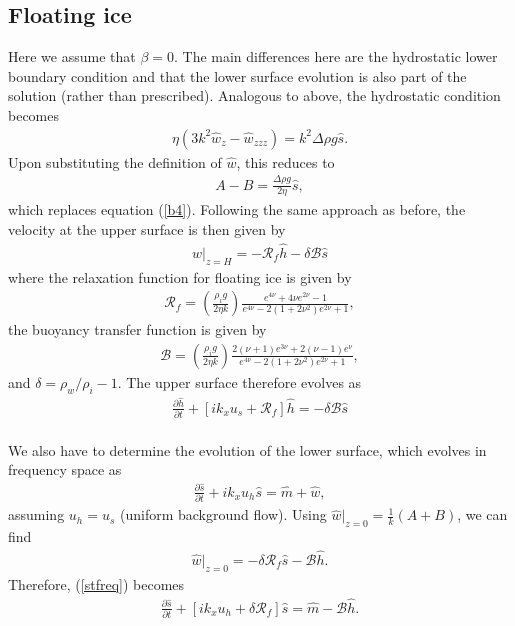 \documentclass[paper=a4, fontsize=11pt]{article}
\begin{document}
\subsection*{Floating ice}
Here we assume that $\beta=0$.
The main differences here are the hydrostatic lower boundary condition
and that the lower surface evolution is also part of the solution (rather than prescribed).
Analogous to above, the hydrostatic condition becomes
\begin{align}
\eta (3k^2 \widehat{w}_{z}-\widehat{w}_{zzz})  = k^2 \Delta\rho g \widehat{s}. \label{b4alt}
\end{align}
Upon substituting the definition of $\widehat{w}$, this reduces to
\begin{align}
A-B = \frac{\Delta \rho g}{2\eta}\widehat{s},
\end{align}
which replaces equation (\ref{b4}).
Following the same approach as before, the velocity at the upper surface is then given by
\begin{align}
w|_{z=H} =  -\mathcal{R}_f\widehat{h} - \delta\mathcal{B}\widehat{s}
\end{align}
where the relaxation function for floating ice is given by
\begin{align}
\mathcal{R}_f = \left(\frac{\rho_i g}{2\eta k}\right) \frac{e^{4\nu} +4\nu e^{2\nu} -1 }{e^{4\nu} -2(1+2\nu^2)e^{2\nu} +1},
\end{align}
the buoyancy transfer function is given by
\begin{align}
\mathcal{B} = \left(\frac{\rho_i g}{2\eta k}\right) \frac{ 2(\nu+1)e^{3\nu}+2(\nu-1)e^{\nu} }{e^{4\nu} -2(1+2\nu^2)e^{2\nu} +1},
\end{align}
and $\delta = \rho_w/\rho_i -1$.
The upper surface therefore evolves as
\begin{align}
\frac{\partial \widehat{h}}{\partial t}+ \left[ik_x u_s  + \mathcal{R}_f\right]\widehat{h} = -\delta\mathcal{B}\widehat{s}
\end{align}
\\ We also have to determine the evolution of the lower surface, which evolves in frequency space as
\begin{align}
\frac{\partial \widehat{s}}{\partial t}+ ik_x u_h \widehat{s} = \widehat{m} + \widehat{w}, \label{stfreq}
\end{align}
assuming $u_h=u_s$ (uniform background flow).
Using $\widehat{w}|_{z=0}= \frac{1}{k}(A+B)$, we can find
\begin{align}
\widehat{w}|_{z=0} = -\delta\mathcal{R}_f\widehat{s} - \mathcal{B} \widehat{h}.
\end{align}
Therefore, (\ref{stfreq}) becomes
\begin{align}
\frac{\partial \widehat{s}}{\partial t}+ [ik_xu_h + \delta\mathcal{R}_f]\widehat{s} = \widehat{m} - \mathcal{B} \widehat{h}.
\end{align}
\end{document}
